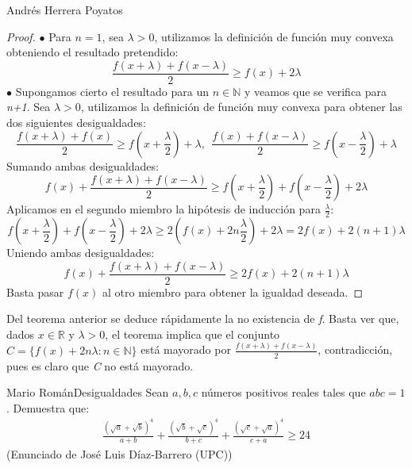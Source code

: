 \documentclass[a4paper, 11pt]{article} %
\numberwithin{prbcounter}{section}
\begin{document}
\begin{solucion}{Andrés Herrera Poyatos}
\begin{proof}
  	    $\bullet$ Para $n=1$, sea $\lambda > 0$, utilizamos la definición de función muy convexa
  	    obteniendo el resultado pretendido:
  	    \begin{equation*}
  	        \frac{f(x+\lambda)+f(x-\lambda)}{2} \geq  f(x) + 2\lambda
  	    \end{equation*}
  	    $\bullet$ Supongamos cierto el resultado para un $n \in \mathbb{N}$ y veamos que se verifica
  	    para \textit{n+1}. Sea $\lambda > 0$, utilizamos la definición de función muy convexa para
  	    obtener las dos siguientes desigualdades: 
  	    \begin{equation*}
  	        \frac{f(x+\lambda)+f(x)}{2} \geq  f\left(x+\frac{\lambda}{2}\right) + \lambda, \ \
  	        \frac{f(x)+f(x-\lambda)}{2} \geq  f\left(x-\frac{\lambda}{2}\right) + \lambda
  	    \end{equation*}
  	    Sumando ambas desigualdades:
  	    \begin{equation*}
  	        f(x) + \frac{f(x+\lambda)+f(x-\lambda)}{2} \geq f\left(x+\frac{\lambda}{2}\right) +
  	        f\left(x-\frac{\lambda}{2}\right) + 2\lambda
  	    \end{equation*}
  	    Aplicamos en el segundo miembro la hipótesis de inducción para $\frac{\lambda}{2}$:
  	    \begin{equation*}
  	        f\left(x+\frac{\lambda}{2}\right) + f\left(x-\frac{\lambda}{2}\right) + 2\lambda
  	        \ge 2\left(f(x) + 2n\frac{\lambda}{2}\right) + 2\lambda = 2f(x) + 2(n+1)\lambda
  	    \end{equation*}
  	    Uniendo ambas desigualdades:
  	    \begin{equation*}
  	        f(x) + \frac{f(x+\lambda)+f(x-\lambda)}{2} \geq 2f(x) + 2(n+1)\lambda
  	    \end{equation*}
  	    Basta pasar $f(x)$ al otro miembro para obtener la igualdad deseada.
  	\end{proof}
  	Del teorema anterior se deduce rápidamente la no existencia de \textit{f}. Basta ver que,
  	dados $x \in \mathbb{R}$ y $\lambda > 0$, el teorema implica que el conjunto
  	$C = \lbrace{f(x) + 2n\lambda : n \in \mathbb{N}\rbrace}$ está mayorado por
  	$\frac{f(x+\lambda)+f(x-\lambda)}{2}$, contradicción, pues es claro que \textit{C}
  	no está mayorado.
  \end{solucion}
    
  
  
  \begin{enunciado}{Mario Román}{Desigualdades}
    Sean $a, b, c$ números positivos reales tales que $abc = 1$. Demuestra que:
    \begin{gather*}
      \frac{\left(\sqrt{a}+\sqrt{b}\right)^4}{a+b}+\frac{\left(\sqrt{b}+\sqrt{c}\right)^4}{b+c}+\frac{\left(\sqrt{c}+\sqrt{a}\right)^4}{c+a}\geq24
    \end{gather*}
    (Enunciado de José Luis Díaz-Barrero (UPC))
  \end{enunciado}
\end{document}
